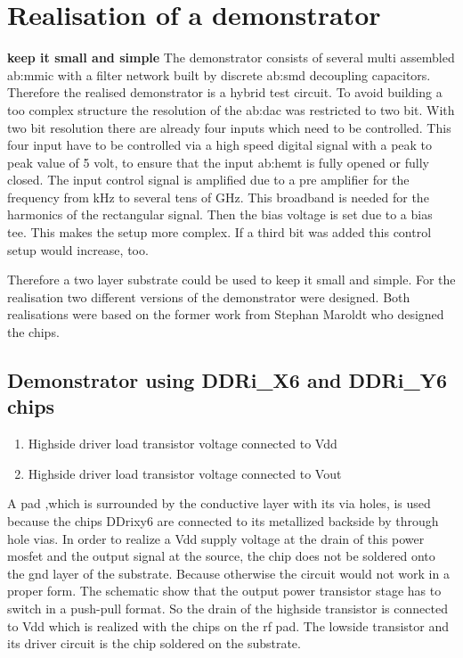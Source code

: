 \chapter{Realisation of a demonstrator}
\textbf{keep it small and simple} 
The demonstrator consists of several multi assembled \gls{ab:mmic} with a filter network built by discrete \gls{ab:smd} decoupling capacitors.
Therefore the realised demonstrator is a hybrid test circuit.
To avoid building a too complex structure the resolution of the \gls{ab:dac} was restricted to two bit.
With two bit resolution there are already four inputs which need to be controlled.
This four input have to be controlled via a high speed digital signal with a peak to peak value of 5 volt, to ensure that the input \gls{ab:hemt} is fully opened or fully closed.
The input control signal is amplified due to a pre amplifier for the frequency from kHz to several tens of GHz.
This broadband is needed for the harmonics of the rectangular signal.
Then the bias voltage is set due to a bias tee.
This makes the setup more complex. 
If a third bit was added this control setup would increase, too.

Therefore a two layer substrate could be used to keep it small and simple.
For the realisation two different versions of the demonstrator were designed. 
Both realisations were based on the former work from Stephan Maroldt who designed the chips. 
\section{Demonstrator using DDRi\_X6 and DDRi\_Y6 chips}
\begin{enumerate}
	\item Highside driver load transistor voltage connected to Vdd
	\item Highside driver load transistor voltage connected to Vout
\end{enumerate}
A pad ,which is surrounded by the conductive layer with its via holes, is used because the chips DDrixy6 are connected to its metallized backside by through hole vias. In order to realize a Vdd supply voltage at the drain of this power mosfet and the output signal at the source, the chip does not be soldered onto the gnd layer of the substrate. 
Because otherwise the circuit would not work in a proper form.
The schematic show that the output power transistor stage has to switch in a push-pull format. So the drain of the highside transistor is connected to Vdd which is realized with the chips on the rf pad. The lowside transistor and its driver circuit is the chip soldered on the substrate.
